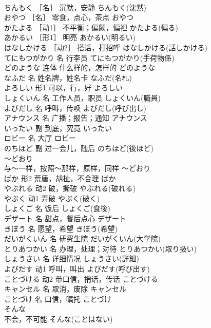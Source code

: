 \documentclass[8pt]{extreport}
\begin{document}
\begin{CJK}{UTF8}{min}
\\	ちんもく	［名］	沉默，安静	ちんもく(沈黙)	
\\	おやつ	［名］	零食，点心，茶点	おやつ	
\\	かたよる	［动1］	不平衡；偏颇，偏袒	かたよる(偏る)	
\\	あかるい	［形1］	明亮	あかるい(明るい)	
\\	はなしかける	［动2］	搭话，打招呼	はなしかける(話しかける)	
\\	てにもつがかり	名	行李员	てにもつがかり(手荷物係)	
\\	どのような	连体	什么样的，怎样的	どのような	
\\	なふだ	名	姓名牌，姓名卡	なふだ(名札)	
\\	よろしい	形1	可以，行，好	よろしい	
\\	しょくいん	名	工作人员，职员	しょくいん(職員)	
\\	よびだし	名	呼叫，传唤	よびだし(呼び出し)	
\\	アナウンス	名	广播；报告；通知	アナウンス	
\\	いったい	副	到底，究竟	いったい	
\\	ロビー	名	大厅	ロビー	
\\	のちほど	副	过一会儿，随后	のちほど(後ほど)	
\\	～どおり	
\\	与～一样，按照～那样，原样，同样	～どおり	
\\	ばか	形2	荒唐，胡扯，不合理	ばか	
\\	やぶれる	动2	破，撕破	やぶれる(破れる)	
\\	やぶく	动1	弄破	やぶく(破く)	
\\	しょくご	名	饭后	しょくご(食後)	
\\	デザート	名	甜点，餐后点心	デザート	
\\	きぼう	名	愿望，希望	きぼう(希望)	
\\	だいがくいん	名	研究生院	だいがくいん(大学院)	
\\	とりあつかい	名	办理，处理；对待	とりあつかい(取り扱い)	
\\	しょうさい	名	详细情况	しょうさい(詳細)	
\\	よびだす	动1	呼叫，叫出	よびだす(呼び出す)	
\\	ことづける	动2	带口信，捎话，传话	ことづける	
\\	キャンセル	名	取消，废除	キャンセル	
\\	ことづけ	名	口信，嘱托	ことづけ	
\\	そんな	
\\	不会，不可能	そんな(ことはない)	

\end{CJK}
\end{document}
